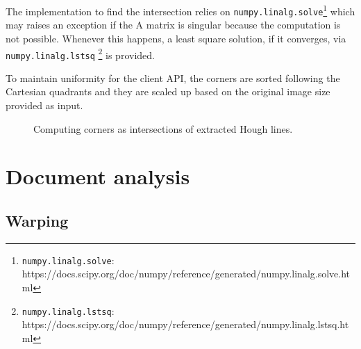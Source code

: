 \documentclass[a4paper]{article}
\begin{document}
The implementation to find the intersection relies on \texttt{numpy.linalg.solve}\footnote{ \texttt{numpy.linalg.solve}: https://docs.scipy.org/doc/numpy/reference/generated/numpy.linalg.solve.html} which may raises an exception if the A matrix is singular because the computation is not possible. Whenever this happens, a least square solution, if it converges, via \texttt{numpy.linalg.lstsq} \footnote{\texttt{numpy.linalg.lstsq}: https://docs.scipy.org/doc/numpy/reference/generated/numpy.linalg.lstsq.html} is provided.

To maintain uniformity for the client API, the corners are sorted following the Cartesian quadrants and they are scaled up based on the original image size provided as input.

\begin{figure}[H]
	\caption{Computing corners as intersections of extracted Hough lines.}
	\label{fig:computingcorners}
\end{figure}

\section{Document analysis}

\subsection{Warping}
\end{document}
